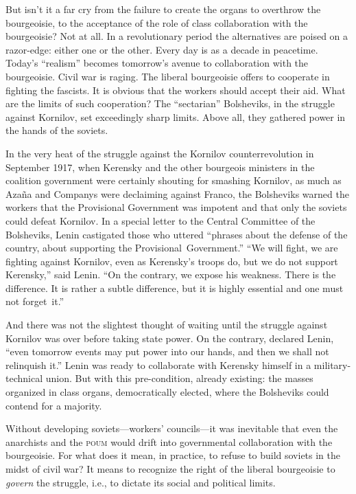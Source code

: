 But isn’t it a far cry from the failure to create the organs to overthrow the bourgeoisie, to the acceptance of the role of class collaboration with the bourgeoisie? Not at all. In a revolutionary period the alternatives are poised on a razor-edge: either one or the other. Every day is as a decade in peacetime. Today’s ``realism'' becomes tomorrow’s avenue to collaboration with the bourgeoisie. Civil war is raging. The liberal bourgeoisie offers to cooperate in fighting the fascists. It is obvious that the workers should accept their aid. What are the limits of such cooperation? The ``sectarian'' Bolsheviks, in the struggle against Kornilov, set exceedingly sharp limits. Above all, they gathered power in the hands of the soviets.
\nowidow

In the very heat of the struggle against the Kornilov counterrevolution in September 1917, when Kerensky and the other bourgeois ministers in the coalition government were certainly shouting for smashing Kornilov, as much as Azaña and Companys were declaiming against Franco, the Bolsheviks warned the workers that the Provisional Government was impotent and that only the soviets could defeat Kornilov. In a special letter to the Central Committee of the Bolsheviks, Lenin castigated those who uttered ``phrases about the defense of the country, about supporting the Provisional~Government.''
``We will fight, we are fighting against Kornilov, even as Kerensky’s troops do, but we do not support Kerensky,'' said Lenin. ``On the contrary, we expose his weakness. There is the difference. It is rather a subtle difference, but it is highly essential and one must not forget~it.''

And there was not the slightest thought of waiting until the struggle against Kornilov was over before taking state power. On the contrary, declared Lenin, ``even tomorrow events may put power into our hands, and then we shall not relinquish it.''
Lenin was ready to collaborate with Kerensky himself in a military-technical union. But with this pre-condition, already existing: the masses organized in class organs, democratically elected, where the Bolsheviks could contend for a majority.

Without developing soviets---workers’ councils---it was inevitable that even the anarchists and the \textsc{poum} would drift into governmental collaboration with the bourgeoisie. For what does it mean, in practice, to refuse to build soviets in the midst of civil war? It means to recognize the right of the liberal bourgeoisie to \emph{govern} the struggle, i.e., to dictate its social and political limits.

